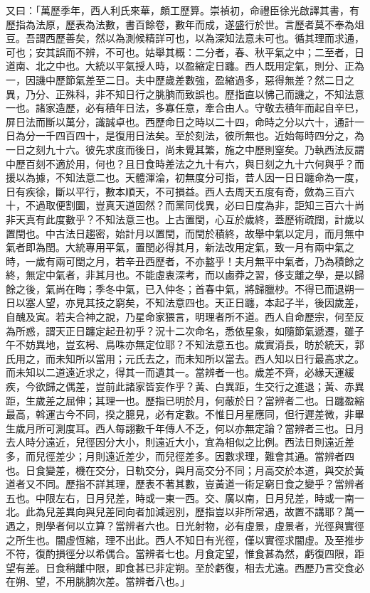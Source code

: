 \begin{pinyinscope}
又曰：「萬歷季年，西人利氏來華，頗工歷算。崇禎初，命禮臣徐光啟譯其書，有歷指為法原，歷表為法數，書百餘卷，數年而成，遂盛行於世。言歷者莫不奉為俎豆。吾謂西歷善矣，然以為測候精詳可也，以為深知法意未可也。循其理而求通，可也；安其誤而不辨，不可也。姑舉其概：二分者，春、秋平氣之中；二至者，日道南、北之中也。大統以平氣授人時，以盈縮定日躔。西人既用定氣，則分、正為一，因譏中歷節氣差至二日。夫中歷歲差數強，盈縮過多，惡得無差？然二日之異，乃分、正殊科，非不知日行之朓朒而致誤也。歷指直以怫己而譏之，不知法意一也。諸家造歷，必有積年日法，多寡任意，牽合由人。守敬去積年而起自辛巳，屏日法而斷以萬分，識誠卓也。西歷命日之時以二十四，命時之分以六十，通計一日為分一千四百四十，是復用日法矣。至於刻法，彼所無也。近始每時四分之，為一日之刻九十六。彼先求度而後日，尚未覺其繁，施之中歷則窒矣。乃執西法反謂中歷百刻不適於用，何也？且日食時差法之九十有六，與日刻之九十六何與乎？而援以為據，不知法意二也。天體渾淪，初無度分可指，昔人因一日日躔命為一度，日有疾徐，斷以平行，數本順天，不可損益。西人去周天五度有奇，斂為三百六十，不過取便割圜，豈真天道固然？而黨同伐異，必曰日度為非，詎知三百六十尚非天真有此度數乎？不知法意三也。上古置閏，心互於歲終，蓋歷術疏闊，計歲以置閏也。中古法日趨密，始計月以置閏，而閏於積終，故舉中氣以定月，而月無中氣者即為閏。大統專用平氣，置閏必得其月，新法改用定氣，致一月有兩中氣之時，一歲有兩可閏之月，若辛丑西歷者，不亦盭乎！夫月無平中氣者，乃為積餘之終，無定中氣者，非其月也。不能虛衷深考，而以鹵莽之習，侈支離之學，是以歸餘之後，氣尚在晦；季冬中氣，已入仲冬；首春中氣，將歸臘杪。不得已而退朔一日以塞人望，亦見其技之窮矣，不知法意四也。天正日躔，本起子半，後因歲差，自醜及寅。若夫合神之說，乃星命家猥言，明理者所不道。西人自命歷宗，何至反為所惑，謂天正日躔定起丑初乎？況十二次命名，悉依星象，如隨節氣遞遷，雖子午不妨異地，豈玄枵、鳥咮亦無定位耶？不知法意五也。歲實消長，昉於統天，郭氏用之，而未知所以當用；元氏去之，而未知所以當去。西人知以日行最高求之。而未知以二道遠近求之，得其一而遺其一。當辨者一也。歲差不齊，必緣天運緩疾，今欲歸之偶差，豈前此諸家皆妄作乎？黃、白異距，生交行之進退；黃、赤異距，生歲差之屈伸；其理一也。歷指已明於月，何蔽於日？當辨者二也。日躔盈縮最高，斡運古今不同，揆之臆見，必有定數。不惟日月星應同，但行遲差微，非畢生歲月所可測度耳。西人每詡數千年傳人不乏，何以亦無定論？當辨者三也。日月去人時分遠近，兒徑因分大小，則遠近大小，宜為相似之比例。西法日則遠近差多，而兒徑差少；月則遠近差少，而兒徑差多。因數求理，難會其通。當辨者四也。日食變差，機在交分，日軌交分，與月高交分不同；月高交於本道，與交於黃道者又不同。歷指不詳其理，歷表不著其數，豈黃道一術足窮日食之變乎？當辨者五也。中限左右，日月兒差，時或一東一西。交、廣以南，日月兒差，時或一南一北。此為兒差異向與兒差同向者加減迥別，歷指豈以非所常遇，故置不講耶？萬一遇之，則學者何以立算？當辨者六也。日光射物，必有虛景，虛景者，光徑與實徑之所生也。闇虛恆縮，理不出此。西人不知日有光徑，僅以實徑求闇虛。及至推步不符，復酌損徑分以希偶合。當辨者七也。月食定望，惟食甚為然，虧復四限，距望有差。日食稍離中限，即食甚已非定朔。至於虧復，相去尤遠。西歷乃言交食必在朔、望，不用朓朒次差。當辨者八也。」


\end{pinyinscope}
